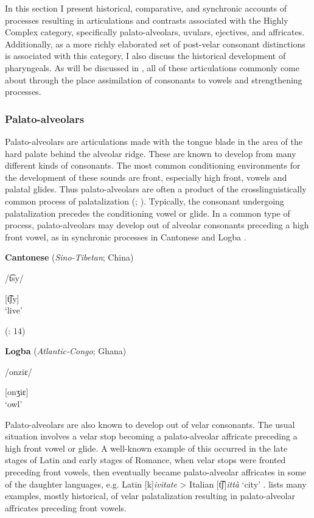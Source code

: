   In this section I present historical, comparative, and synchronic accounts of processes resulting in articulations and contrasts associated with the Highly Complex category, specifically palato-alveolars, uvulars, ejectives, and affricates. Additionally, as a more richly elaborated set of post-velar consonant distinctions is associated with this category, I also discuss the historical development of pharyngeals. As will be discussed in , all of these articulations commonly come about through the place assimilation of consonants to vowels and strengthening processes.

\subsubsection{{Palato-alveolars}}\label{sec:4.5.2.1}

  Palato-alveolars are articulations made with the tongue blade in the area of the hard palate behind the alveolar ridge. These are known to develop from many different kinds of consonants. The most common conditioning environments for the development of these sounds are front, especially high front, vowels and palatal glides. Thus palato-alveolars are often a product of the crosslinguistically common process of palatalization (\citealt{Bhat1978}; \citealt{Bateman2007,BybeeEasterday2019}). Typically, the consonant undergoing palatalization precedes the conditioning vowel or glide. In a common type of process, palato-alveolars may develop out of alveolar consonants preceding a high front vowel, as in synchronic processes in Cantonese  and Logba .

\ea\label{ex:4.36}
  \textbf{Cantonese} (\textit{Sino-Tibetan}; China)

/t͡sy/

[t͡ʃy]\\
\glt ‘live’

(\citealt{MatthewsYip1994}: 14)
\z

\ea\label{ex:4.37}
  \textbf{Logba} (\textit{Atlantic-Congo}; Ghana)

/onziɛ/

[onʒiɛ]\\
\glt ‘owl’
\citep[18]{Dorvlo2008}
\z

  Palato-alveolars are also known to develop out of velar consonants. The usual situation involves a velar stop becoming a palato-alveolar affricate preceding a high front vowel or glide. A well-known example of this occurred in the late stages of Latin and early stages of Romance, when velar stops were fronted preceding front vowels, then eventually became palato-alveolar affricates in some of the daughter languages, e.g. Latin [k]\textit{ivitate} > Italian [t͡ʃ]\textit{ittà} ‘city’ \citep[113]{Posner1996}. \citet{Bhat1978} lists many examples, mostly historical, of velar palatalization resulting in palato-alveolar affricates preceding front vowels.

